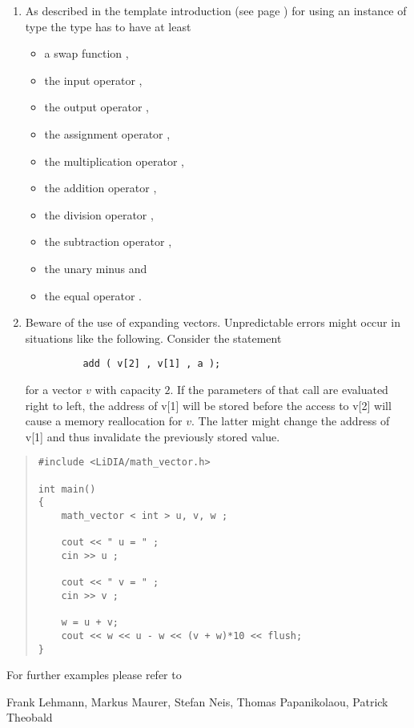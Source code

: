 \NOTES

\begin{enumerate}
\item
As described in the template introduction
(see page \pageref{template_introduction}) for using an instance of
type  the type  has to have at least
\begin{itemize}
\item a swap function ,
\item the input operator \code{>>},
\item the output operator \code{<<},
\item the assignment operator \code{=},
\item the multiplication operator \code{*},
\item the addition operator \code{+},
\item the division operator \code{/},
\item the subtraction operator \code{-},
\item the unary minus \code{-} and
\item the equal operator \code{==}.
\end{itemize}
\item Beware of the use of expanding vectors.  Unpredictable errors might occur in situations
  like the following.  Consider the statement
\begin{verbatim}
          add ( v[2] , v[1] , a );
\end{verbatim}
  for a vector $v$ with capacity $2$.  If the parameters of that call are evaluated right to
  left, the address of v[1] will be stored before the access to v[2] will cause a memory
  reallocation for $v$.  The latter might change the address of v[1] and thus invalidate the
  previously stored value.
\end{enumerate}



\EXAMPLES

\begin{quote}
\begin{verbatim}
#include <LiDIA/math_vector.h>

int main()
{
    math_vector < int > u, v, w ;

    cout << " u = " ;
    cin >> u ;

    cout << " v = " ;
    cin >> v ;

    w = u + v;
    cout << w << u - w << (v + w)*10 << flush;
}
\end{verbatim}
\end{quote}

For further examples please refer to 



\AUTHOR

Frank Lehmann, Markus Maurer, Stefan Neis, Thomas Papanikolaou, Patrick
Theobald
